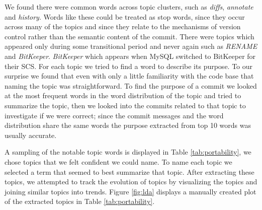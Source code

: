 \documentclass[times, 10pt,twocolumn]{article}
\begin{document}
We found there were common words across topic clusters, such as
\emph{diffs}, \emph{annotate} and \emph{history}.
Words like these could be treated as stop words, since they occur
across many of the topics and since they relate to the mechanisms of
version control rather than the semantic content of the commit.
There were topics which appeared only during some transitional period and never again
such as \emph{RENAME} and \emph{BitKeeper}. \emph{BitKeeper} which appears when MySQL switched to  BitKeeper for their SCS.
For each topic we tried to find a word to describe its purpose.
To our surprise we found that even with only a
little familiarity with the code base that naming the topic was
straightforward. To find the purpose of a commit we looked at the most
frequent words in the word distribution of the topic and tried to
summarize the topic, then we looked into the commits related to that
topic to investigate if we were correct; since the commit messages and
the word distribution share the same words the purpose extracted from
top 10 words was usually accurate.

A sampling of the notable topic words is displayed in Table
\ref{tab:portability}, we chose topics that we felt confident we could
name.  To name each topic we selected a term that seemed to best
summarize that topic.  After extracting these topics, we attempted to
track the evolution of topics by visualizing the topics and joining
similar topics into trends.  Figure \ref{fig:lda} displays a manually
created plot of the extracted topics in Table
\ref{tab:portability}.
\end{document}
